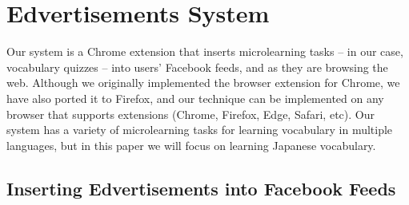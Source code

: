 \documentclass{sigchi}
\begin{document}




\section{Edvertisements System}

Our system is a Chrome extension that inserts microlearning tasks -- in our case, vocabulary quizzes -- into users' Facebook feeds, and as they are browsing the web. Although we originally implemented the browser extension for Chrome, we have also ported it to Firefox, and our technique can be implemented on any browser that supports extensions (Chrome, Firefox, Edge, Safari, etc). Our system has a variety of microlearning tasks for learning vocabulary in multiple languages, but in this paper we will focus on learning Japanese vocabulary.



\subsection{Inserting Edvertisements into Facebook Feeds}
\end{document}
